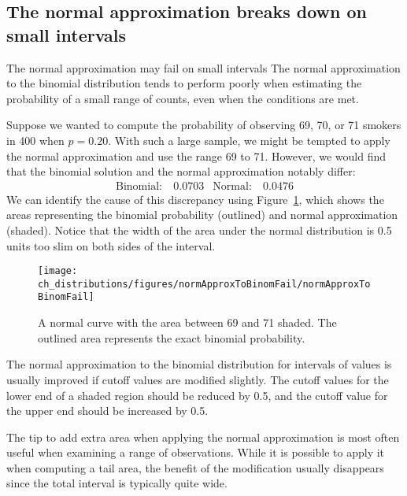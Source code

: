 \subsection{The normal approximation breaks down on small intervals}

\begin{caution}
{The normal approximation may fail on small intervals}
{The normal approximation to the binomial distribution tends to perform poorly when estimating the probability of a small range of counts, even when the conditions are met.}
\end{caution}

Suppose we wanted to compute the probability of observing 69, 70, or 71 smokers in 400 when $p=0.20$. With such a large sample, we might be tempted to apply the normal approximation and use the range 69 to 71. However, we would find that the binomial solution and the normal approximation notably differ:
\begin{align*}
\text{Binomial:}&\ 0.0703
&\text{Normal:}&\ 0.0476
\end{align*}
We can identify the cause of this discrepancy using Figure~\ref{normApproxToBinomFail}, which shows the areas representing the binomial probability (outlined) and normal approximation (shaded). Notice that the width of the area under the normal distribution is 0.5 units too slim on both sides of the interval.

\begin{figure}[h]
\centering
\texttt{[image: ch\_distributions/figures/normApproxToBinomFail/normApproxToBinomFail]}
\caption{A normal curve with the area between 69 and 71 shaded. The outlined area represents the exact binomial probability.}
\label{normApproxToBinomFail}
\end{figure}

\begin{tipBox}{
The normal approximation to the binomial distribution for intervals of values is usually improved if cutoff values are modified slightly. The cutoff values for the lower end of a shaded region should be reduced by 0.5, and the cutoff value for the upper end should be increased by 0.5.}
\end{tipBox}

The tip to add extra area when applying the normal approximation is most often useful when examining a range of observations. While it is possible to apply it when computing a tail area, the benefit of the modification usually disappears since the total interval is typically quite wide.

